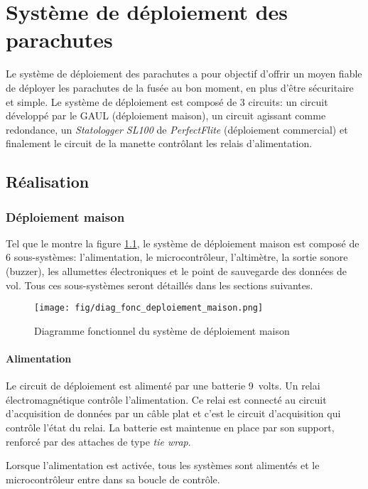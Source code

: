 \chapter{Système de déploiement des parachutes}
\label{chap:deploiement}

Le système de déploiement des parachutes a pour objectif d'offrir un moyen
fiable de déployer les parachutes de la fusée au bon moment, en plus d'être
sécuritaire et simple. Le système de déploiement est composé de 3 circuits: un
circuit développé par le GAUL (déploiement maison), un circuit agissant comme
redondance, un \textit{Statologger SL100} de \textit{PerfectFlite} (déploiement
commercial) et finalement le circuit de la manette contrôlant les relais
d'alimentation.

\section{Réalisation}

\subsection{Déploiement maison}


Tel que le montre la figure \ref{f:diag_fonc_deploiement_maison}, le système de
déploiement maison est composé de 6 sous-systèmes: l'alimentation, le
microcontrôleur, l'altimètre, la sortie sonore (buzzer), les allumettes
électroniques et le point de sauvegarde des données de vol. Tous ces
sous-systèmes seront détaillés dans les sections suivantes.

\begin{figure}[H]
	\center
	\texttt{[image: fig/diag\_fonc\_deploiement\_maison.png]}
	\caption{Diagramme fonctionnel du système de déploiement maison}
	\label{f:diag_fonc_deploiement_maison}
\end{figure}

\subsubsection{Alimentation}

Le circuit de déploiement est alimenté par une batterie 9~volts. Un relai
électromagnétique contrôle l'alimentation. Ce relai est connecté au circuit
d'acquisition de données par un câble plat et c'est le circuit d'acquisition
qui contrôle l'état du relai. La batterie est maintenue en place par son
support, renforcé par des attaches de type \textit{tie wrap}.
\\
\par
Lorsque l'alimentation est activée, tous les systèmes sont alimentés et le
microcontrôleur entre dans sa boucle de contrôle.

